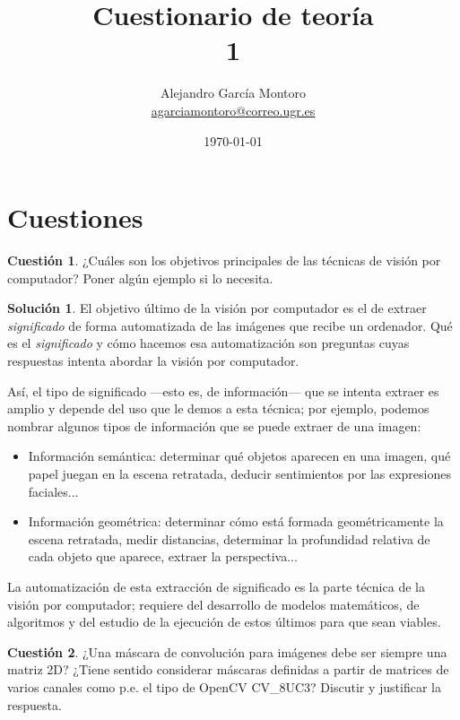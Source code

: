 \documentclass[a4paper, 11pt]{article}
\title{Cuestionario de teoría \\ 1}
\author{Alejandro García Montoro\\
    \href{mailto:agarciamontoro@correo.ugr.es}{agarciamontoro@correo.ugr.es}}
\date{\today}
\theoremstyle{definition}
\newtheorem*{solucion}{Solución}
\theoremstyle{theorem}
\newtheorem{cuestion}{Cuestión}
\begin{document}
  \maketitle

  \section{Cuestiones}

  \begin{cuestion}
      ¿Cuáles son los objetivos principales de las técnicas de visión por computador? Poner algún ejemplo si lo necesita.
  \end{cuestion}

  \begin{solucion}
      El objetivo último de la visión por computador es el de extraer \emph{significado} de forma automatizada de las imágenes que recibe un ordenador. Qué es el \emph{significado} y cómo hacemos esa automatización son preguntas cuyas respuestas intenta abordar la visión por computador.

      Así, el tipo de significado ---esto es, de información--- que se intenta extraer es amplio y depende del uso que le demos a esta técnica; por ejemplo, podemos nombrar algunos tipos de información que se puede extraer de una imagen:
      \begin{itemize}
          \item Información semántica: determinar qué objetos aparecen en una imagen, qué papel juegan en la escena retratada, deducir sentimientos por las expresiones faciales...
          \item Información geométrica: determinar cómo está formada geométricamente la escena retratada, medir distancias, determinar la profundidad relativa de cada objeto que aparece, extraer la perspectiva...
      \end{itemize}

      La automatización de esta extracción de significado es la parte técnica de la visión por computador; requiere del desarrollo de modelos matemáticos, de algoritmos y del estudio de la ejecución de estos últimos para que sean viables.
  \end{solucion}

  \begin{cuestion}
      ¿Una máscara de convolución para imágenes debe ser siempre una matriz 2D? ¿Tiene sentido considerar máscaras definidas a partir de matrices de varios canales como p.e. el tipo de OpenCV CV\_8UC3? Discutir y justificar la respuesta.
  \end{cuestion}
\end{document}
